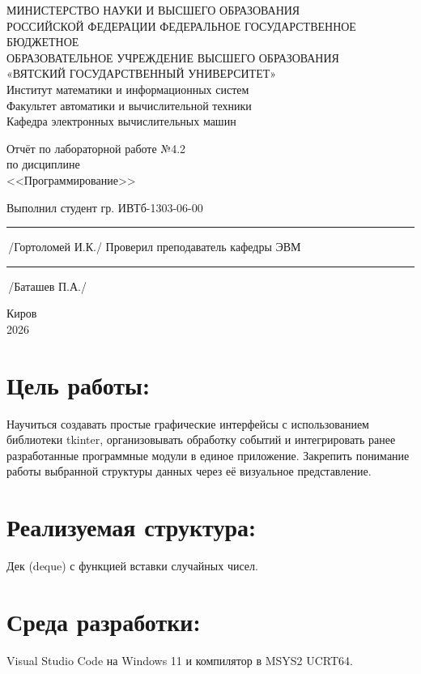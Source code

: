 \documentclass[oneside,a4paper,14pt]{extarticle} %
\begin{document}
	\newpage\thispagestyle{empty}
	\begin{center}
		МИНИСТЕРСТВО НАУКИ И ВЫСШЕГО ОБРАЗОВАНИЯ\\
			РОССИЙСКОЙ ФЕДЕРАЦИИ
			ФЕДЕРАЛЬНОЕ ГОСУДАРСТВЕННОЕ БЮДЖЕТНОЕ\\
			ОБРАЗОВАТЕЛЬНОЕ
			УЧРЕЖДЕНИЕ ВЫСШЕГО ОБРАЗОВАНИЯ\\
			«ВЯТСКИЙ ГОСУДАРСТВЕННЫЙ УНИВЕРСИТЕТ»\\
			Институт математики и информационных систем\\
			Факультет автоматики и вычислительной техники\\
			Кафедра электронных вычислительных машин
	\end{center}
	\vspace{20mm}

	\begin{center}
		Отчёт по лабораторной работе №4.2\\
		по дисциплине\\
		<<Программирование>>\\
	\end{center}
	\vspace{48mm}

	\noindent
	Выполнил студент гр. ИВТб-1303-06-00 \hfill \rule[-0,5mm]{30mm}{0.15mm}\,/Гортоломей И.К./
	\newline
	Проверил преподаватель кафедры ЭВМ \hfill \rule[-0,5mm]{30mm}{0.15mm}\,/Баташев П.А./

	\vfill
	\begin{center}
		Киров\\
		2026
	\end{center}

	\newpage
	\thispagestyle{empty}

	\section*{Цель работы:} Научиться создавать простые графические интерфейсы с использованием библиотеки tkinter, организовывать обработку событий и интегрировать ранее разработанные программные модули в единое приложение. Закрепить понимание работы выбранной структуры данных через её визуальное представление.
	\section*{Реализуемая структура:} Дек (deque) с функцией вставки случайных чисел.
	\section*{Среда разработки:} Visual Studio Code на Windows 11 и компилятор в MSYS2 UCRT64.
	\newpage
	
\end{document}
